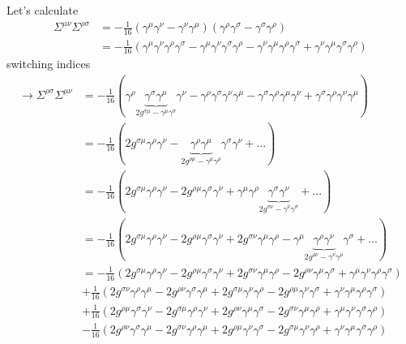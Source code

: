 \documentclass[../main.tex]{subfiles}
\begin{document}
Let's calculate
\begin{align}
\Sigma^{\mu\nu}\Sigma^{\rho\sigma}
&=-\frac{1}{16}(\gamma^\mu\gamma^\nu-\gamma^\nu\gamma^\mu)(\gamma^\rho\gamma^\sigma-\gamma^\sigma\gamma^\rho)\\
&=-\frac{1}{16}(
\gamma^\mu\gamma^\nu\gamma^\rho\gamma^\sigma
-\gamma^\mu\gamma^\nu\gamma^\sigma\gamma^\rho
-\gamma^\nu\gamma^\mu\gamma^\rho\gamma^\sigma
+\gamma^\nu\gamma^\mu\gamma^\sigma\gamma^\rho)
\end{align}
switching indices
\begin{align}
\rightarrow\Sigma^{\rho\sigma}\Sigma^{\mu\nu}
&=-\frac{1}{16}(
\gamma^\rho\underbrace{\gamma^\sigma\gamma^\mu}_{2g^{\sigma\mu}-\gamma^\mu\gamma^\sigma}\gamma^\nu
-\gamma^\rho\gamma^\sigma\gamma^\nu\gamma^\mu
-\gamma^\sigma\gamma^\rho\gamma^\mu\gamma^\nu
+\gamma^\sigma\gamma^\rho\gamma^\nu\gamma^\mu)\\
&=-\frac{1}{16}(2g^{\sigma\mu}
\gamma^\rho\gamma^\nu-\underbrace{\gamma^\rho\gamma^\mu}_{2g^{\rho\mu}-\gamma^\mu\gamma^\rho}\gamma^\sigma\gamma^\nu+...)\\
&=-\frac{1}{16}(2g^{\sigma\mu}
\gamma^\rho\gamma^\nu- 2g^{\rho\mu}\gamma^\sigma\gamma^\nu+\gamma^\mu\gamma^\rho\underbrace{\gamma^\sigma\gamma^\nu}_{2g^{\sigma\nu}-\gamma^\nu\gamma^\sigma}+...)\\
&=-\frac{1}{16}(2g^{\sigma\mu}
\gamma^\rho\gamma^\nu- 2g^{\rho\mu}\gamma^\sigma\gamma^\nu+2g^{\sigma\nu}\gamma^\mu\gamma^\rho-\gamma^\mu\underbrace{\gamma^\rho\gamma^\nu}_{2g^{\rho\nu}-\gamma^\nu\gamma^\rho}\gamma^\sigma+...)\\
&=-\frac{1}{16}(
2g^{\sigma\mu}\gamma^\rho\gamma^\nu
-2g^{\rho\mu}\gamma^\sigma\gamma^\nu
+2g^{\sigma\nu}\gamma^\mu\gamma^\rho
-2g^{\rho\nu}\gamma^\mu\gamma^\sigma
+\gamma^\mu\gamma^\nu\gamma^\rho\gamma^\sigma)\\
&+\frac{1}{16}(
2g^{\sigma\nu}\gamma^\rho\gamma^\mu
-2g^{\rho\nu}\gamma^\sigma\gamma^\mu
+2g^{\sigma\mu}\gamma^\nu\gamma^\rho
-2g^{\rho\mu}\gamma^\nu\gamma^\sigma
+\gamma^\nu\gamma^\mu\gamma^\rho\gamma^\sigma)\\
&+\frac{1}{16}(
2g^{\rho\mu}\gamma^\sigma\gamma^\nu
-2g^{\sigma\mu}\gamma^\rho\gamma^\nu
+2g^{\rho\nu}\gamma^\mu\gamma^\sigma
-2g^{\sigma\nu}\gamma^\mu\gamma^\rho
+\gamma^\mu\gamma^\nu\gamma^\sigma\gamma^\rho)\\
&-\frac{1}{16}(
2g^{\rho\nu}\gamma^\sigma\gamma^\mu
-2g^{\sigma\nu}\gamma^\rho\gamma^\mu
+2g^{\rho\mu}\gamma^\nu\gamma^\sigma
-2g^{\sigma\mu}\gamma^\nu\gamma^\rho
+\gamma^\nu\gamma^\mu\gamma^\sigma\gamma^\rho)
\end{align}
\end{document}

